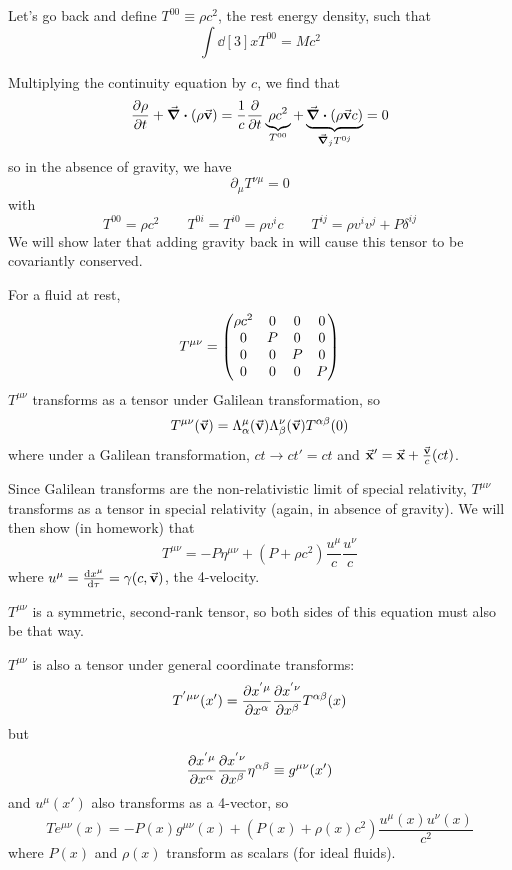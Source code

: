 \documentclass[a4paper,twoside,master.tex]{subfiles}
\begin{document}
Let's go back and define $ T^{00} \equiv \rho c^2 $, the rest energy density, such that
\begin{equation}
    \int \dd[3]{x}T^{00} = M c^2
\end{equation}

Multiplying the continuity equation by $ c $, we find that
\begin{equation}
    \pdv{\rho}{t} + \div{(\rho \va{v})} = \frac{1}{c} \pdv{t} \underbrace{\rho c^2}_{T^{00}} + \underbrace{\div{(\rho \va{v}c)}}_{\grad_j{T^{0j}}} = 0
\end{equation}
so in the absence of gravity, we have
\begin{equation}
    \partial_{\mu} T^{\nu \mu} = 0
\end{equation}
with
\begin{equation}
    T^{00} = \rho c^2 \qquad T^{0i} = T^{i0} = \rho v^i c\qquad T^{ij} = \rho v^i v^j + P \delta^{ij}
\end{equation}
We will show later that adding gravity back in will cause this tensor to be covariantly conserved.


For a fluid at rest,
\begin{equation}
    T^{\mu \nu} = \mqty(\dmat[0]{\rho c^2, P, P, P})
\end{equation}
$ T^{\mu \nu} $ transforms as a tensor under Galilean transformation, so
\begin{equation}
    T^{\mu \nu}(\va{v}) = \Lambda^{\mu}_{\alpha}(\va{v}) \Lambda^{\nu}_{\beta}(\va{v}) T^{\alpha \beta}(0)
\end{equation}
where under a Galilean transformation, $ ct \to c t' = ct $ and $ \va{x}' = \va{x} + \frac{\va{v}}{c}(ct) $.

Since Galilean transforms are the non-relativistic limit of special relativity, $ T^{\mu \nu} $ transforms as a tensor in special relativity (again, in absence of gravity). We will then show (in homework) that
\begin{equation}
    T^{\mu \nu} = -P \eta^{\mu \nu} + (P + \rho c^2) \frac{u^{\mu}}{c} \frac{u^{\nu}}{c}
\end{equation}
where $ u^{\mu} = \dv{x^{\mu}}{\tau} = \gamma (c, \va{v}) $, the 4-velocity.

$ T^{\mu \nu} $ is a symmetric, second-rank tensor, so both sides of this equation must also be that way.

$ T^{\mu \nu} $ is also a tensor under general coordinate transforms:
\begin{equation}
    T^{' \mu \nu} (x')= \pdv{x^{' \mu}}{x^{\alpha}} \pdv{x^{' \nu}}{x^{\beta}} T^{\alpha \beta} (x)
\end{equation}
but
\begin{equation}
    \pdv{x^{' \mu}}{x^{\alpha}} \pdv{x^{' \nu}}{x^{\beta}} \eta^{\alpha \beta} \equiv g^{\mu \nu}(x') 
\end{equation}
and $ u^{\mu}(x') $ also transforms as a 4-vector, so
\begin{equation}
    Te^{\mu \nu}(x) = - P(x) g^{\mu \nu}(x) + (P(x) + \rho(x) c^2) \frac{u^{\mu}(x) u^{\nu}(x)}{c^2}
\end{equation}
where $ P(x) $ and $ \rho(x) $ transform as scalars (for ideal fluids).
\end{document}
